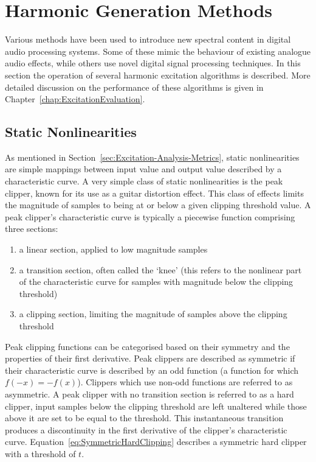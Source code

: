 \section{Harmonic Generation Methods}
\label{sec:Excitation-Methods}
	Various methods have been used to introduce new spectral content in digital audio processing systems.  Some of
	these mimic the behaviour of existing analogue audio effects, while others use novel digital signal processing
	techniques. In this section the operation of several harmonic excitation algorithms is described. More detailed
	discussion on the performance of these algorithms is given in Chapter~\ref{chap:ExcitationEvaluation}.

	\subsection{Static Nonlinearities}
	\label{sec:Excitation-Methods-Statics}
		As mentioned in Section~\ref{sec:Excitation-Analysis-Metrics}, static nonlinearities are simple mappings
		between input value and output value described by a characteristic curve. A very simple class of static
		nonlinearities is the peak clipper, known for its use as a guitar distortion effect. This class of effects
		limits the magnitude of samples to being at or below a given clipping threshold value. A peak clipper's
		characteristic curve is typically a piecewise function comprising three sections:

		\begin{enumerate}
			\item a linear section, applied to low magnitude samples
			\item a transition section, often called the `knee' (this refers to the nonlinear part of the
				characteristic curve for samples with magnitude below the clipping threshold)
			\item a clipping section, limiting the magnitude of samples above the clipping threshold
		\end{enumerate}
		
		Peak clipping functions can be categorised based on their symmetry and the properties of their first
		derivative. Peak clippers are described as symmetric if their characteristic curve is described by an odd
		function (a function for which $f(-x) = -f(x)$). Clippers which use non-odd functions are referred to as
		asymmetric. A peak clipper with no transition section is referred to as a hard clipper, input samples below
		the clipping threshold are left unaltered while those above it are set to be equal to the threshold. This
		instantaneous transition produces a discontinuity in the first derivative of the clipper's characteristic
		curve. Equation~\ref{eq:SymmetricHardClipping} describes a symmetric hard clipper with a threshold of $t$.

